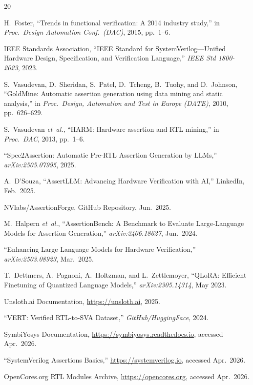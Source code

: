 \documentclass[conference]{IEEEtran}
\begin{document}
\balance

\begin{thebibliography}{20}

H.~Foster, ``Trends in functional verification: A 2014 industry study,'' in \emph{Proc.\ Design Automation Conf.\ (DAC)}, 2015, pp.~1--6.

IEEE Standards Association, ``IEEE Standard for SystemVerilog---Unified Hardware Design, Specification, and Verification Language,'' \emph{IEEE Std 1800-2023}, 2023.

S.~Vasudevan, D.~Sheridan, S.~Patel, D.~Tcheng, B.~Tuohy, and D.~Johnson, ``GoldMine: Automatic assertion generation using data mining and static analysis,'' in \emph{Proc.\ Design, Automation and Test in Europe (DATE)}, 2010, pp.~626--629.

S.~Vasudevan \emph{et~al.}, ``HARM: Hardware assertion and RTL mining,'' in \emph{Proc.\ DAC}, 2013, pp.~1--6.

``Spec2Assertion: Automatic Pre-RTL Assertion Generation by LLMs,'' \emph{arXiv:2505.07995}, 2025.

A.~D'Souza, ``AssertLLM: Advancing Hardware Verification with AI,'' LinkedIn, Feb.\ 2025.

NVlabs/AssertionForge, GitHub Repository, Jun.\ 2025.

M.~Halpern \emph{et~al.}, ``AssertionBench: A Benchmark to Evaluate Large-Language Models for Assertion Generation,'' \emph{arXiv:2406.18627}, Jun.\ 2024.

``Enhancing Large Language Models for Hardware Verification,'' \emph{arXiv:2503.08923}, Mar.\ 2025.

T.~Dettmers, A.~Pagnoni, A.~Holtzman, and L.~Zettlemoyer, ``QLoRA: Efficient Finetuning of Quantized Language Models,'' \emph{arXiv:2305.14314}, May 2023.

Unsloth.ai Documentation, \url{https://unsloth.ai}, 2025.

``VERT: Verified RTL-to-SVA Dataset,'' \emph{GitHub/HuggingFace}, 2024.

SymbiYosys Documentation, \url{https://symbiyosys.readthedocs.io}, accessed Apr.\ 2026.

``SystemVerilog Assertions Basics,'' \url{https://systemverilog.io}, accessed Apr.\ 2026.

OpenCores.org RTL Modules Archive, \url{https://opencores.org}, accessed Apr.\ 2026.

\end{thebibliography}
\end{document}
